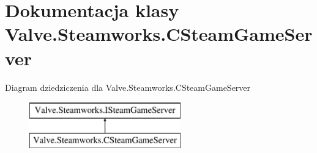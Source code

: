 \hypertarget{class_valve_1_1_steamworks_1_1_c_steam_game_server}{}\section{Dokumentacja klasy Valve.\+Steamworks.\+C\+Steam\+Game\+Server}
\label{class_valve_1_1_steamworks_1_1_c_steam_game_server}
Diagram dziedziczenia dla Valve.\+Steamworks.\+C\+Steam\+Game\+Server\begin{figure}[H]
\begin{center}
\leavevmode
\includegraphics[height=2.000000cm]{class_valve_1_1_steamworks_1_1_c_steam_game_server}
\end{center}
\end{figure}
